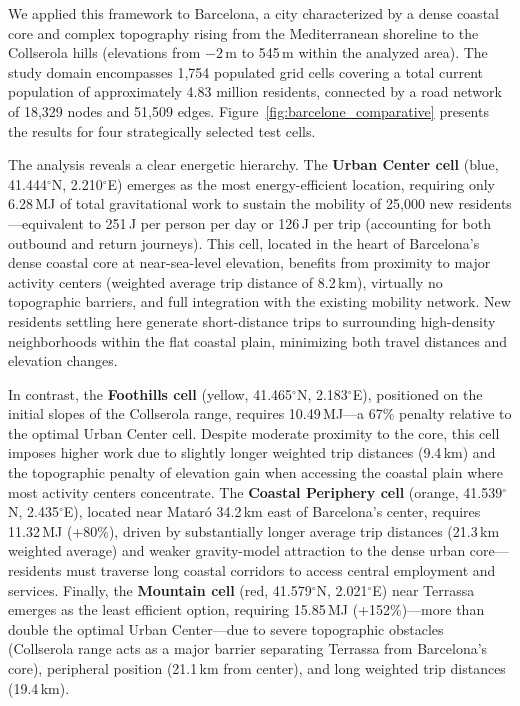 \documentclass[twocolumn,amsmath,amssymb,floatfix,nature,shownopacs,footinbib,superscriptaddress]{revtex4-1} %
\begin{document}
We applied this framework to Barcelona, a city characterized by a dense coastal core and complex topography rising from the Mediterranean shoreline to the Collserola hills (elevations from $-2$\,m to 545\,m within the analyzed area).  
The study domain encompasses 1,754 populated grid cells covering a total current population of approximately 4.83 million residents, connected by a road network of 18,329 nodes and 51,509 edges.  
Figure~\ref{fig:barcelone_comparative} presents the results for four strategically selected test cells.

The analysis reveals a clear energetic hierarchy.  
The \textbf{Urban Center cell} (blue, 41.444$^\circ$N, 2.210$^\circ$E) emerges as the most energy-efficient location, requiring only 6.28\,MJ of total gravitational work to sustain the mobility of 25,000 new residents—equivalent to 251\,J per person per day or 126\,J per trip (accounting for both outbound and return journeys).  
This cell, located in the heart of Barcelona's dense coastal core at near-sea-level elevation, benefits from proximity to major activity centers (weighted average trip distance of 8.2\,km), virtually no topographic barriers, and full integration with the existing mobility network.  
New residents settling here generate short-distance trips to surrounding high-density neighborhoods within the flat coastal plain, minimizing both travel distances and elevation changes.

In contrast, the \textbf{Foothills cell} (yellow, 41.465$^\circ$N, 2.183$^\circ$E), positioned on the initial slopes of the Collserola range, requires 10.49\,MJ—a 67\% penalty relative to the optimal Urban Center cell.  
Despite moderate proximity to the core, this cell imposes higher work due to slightly longer weighted trip distances (9.4\,km) and the topographic penalty of elevation gain when accessing the coastal plain where most activity centers concentrate.  
The \textbf{Coastal Periphery cell} (orange, 41.539$^\circ$N, 2.435$^\circ$E), located near Mataró 34.2\,km east of Barcelona's center, requires 11.32\,MJ (+80\%), driven by substantially longer average trip distances (21.3\,km weighted average) and weaker gravity-model attraction to the dense urban core—residents must traverse long coastal corridors to access central employment and services.  
Finally, the \textbf{Mountain cell} (red, 41.579$^\circ$N, 2.021$^\circ$E) near Terrassa emerges as the least efficient option, requiring 15.85\,MJ (+152\%)—more than double the optimal Urban Center—due to severe topographic obstacles (Collserola range acts as a major barrier separating Terrassa from Barcelona's core), peripheral position (21.1\,km from center), and long weighted trip distances (19.4\,km).
\end{document}
